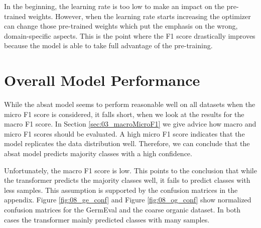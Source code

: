 In the beginning, the learning rate is too low to make an impact on the pre-trained weights. However, when the learning rate starts increasing the optimizer can change those pre-trained weights which put the emphasis on the wrong, domain-specific aspects. This is the point where the F1 score drastically improves because the model is able to take full advantage of the pre-training.

\section{Overall Model Performance}

While the \gls{absat} model seems to perform reasonable well on all datasets when the micro F1 score is considered, it falls short, when we look at the results for the macro F1 score. In Section \ref{sec:03_macroMicroF1} we give advice how macro and micro F1 scores should be evaluated. A high micro F1 score indicates that the model replicates the data distribution well. Therefore, we can conclude that the \gls{absat} model predicts majority classes with a high confidence. 
\bigskip

Unfortunately, the macro F1 score is low. This points to the conclusion that while the transformer predicts the majority classes well, it fails to predict classes with less samples. This assumption is supported by the confusion matrices in the appendix. Figure \ref{fig:08_ge_conf} and Figure \ref{fig:08_og_conf} show normalized confusion matrices for the GermEval and the coarse organic dataset. In both cases the transformer mainly predicted classes with many samples.
